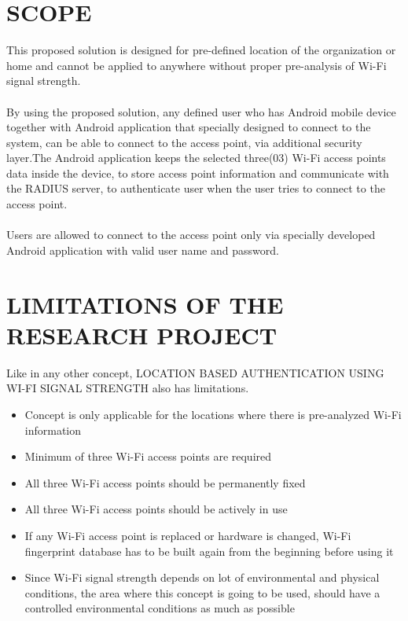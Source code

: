 \section{SCOPE}
This proposed solution is designed for pre-defined location of the organization or home and cannot be applied to anywhere without proper pre-analysis of Wi-Fi signal strength. 
\paragraph{}
By using the proposed solution, any defined user who has Android mobile device together with  Android application that specially designed to connect to the system, can be able to connect to the access point, via additional security layer.The Android application keeps the selected three(03) Wi-Fi access points data inside the device, to store access point information and communicate with the RADIUS server, to authenticate user when the user tries to connect to the access point.
\paragraph{}
Users are allowed to connect to the access point only via specially developed Android application with valid user name and password.

\section{LIMITATIONS OF THE RESEARCH PROJECT}
Like in any other concept, LOCATION BASED AUTHENTICATION USING WI-FI SIGNAL STRENGTH also has limitations.

\begin{itemize}
	\item Concept is only applicable for the locations where there is pre-analyzed Wi-Fi information
	\item Minimum of three Wi-Fi access points are required
	\item All three Wi-Fi access points should be permanently fixed 
	\item All three Wi-Fi access points should be actively in use
	\item If any Wi-Fi access point is replaced or hardware is changed, Wi-Fi fingerprint database has to be built again from the beginning before using it
	\item Since Wi-Fi signal strength depends on lot of environmental and physical conditions, the area where this concept is going to be used, should have a controlled environmental conditions as much as possible
\end{itemize}

